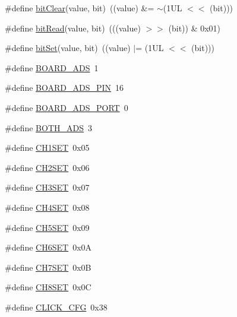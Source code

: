 \begin{DoxyCompactItemize}
\item 
\#define \hyperlink{group__Definitions__ADS1299_gabbe843c0521806a4ab2e7cffe44769e2}{bit\+Clear}(value,  bit)~((value) \&= $\sim$(1\+U\+L $<$$<$ (bit)))
\item 
\#define \hyperlink{group__Definitions__ADS1299_gaff20d8c0a05ad3043afa2e4ad9ebe768}{bit\+Read}(value,  bit)~(((value) $>$$>$ (bit)) \& 0x01)
\item 
\#define \hyperlink{group__Definitions__ADS1299_ga6a8195c0e930f86c6af03ba6af8b41dd}{bit\+Set}(value,  bit)~((value) $\vert$= (1\+U\+L $<$$<$ (bit)))
\item 
\#define \hyperlink{group__Definitions__ADS1299_ga00b00a77ec0833201721a60e77c1589e}{B\+O\+A\+R\+D\+\_\+\+A\+DS}~1
\item 
\#define \hyperlink{group__Definitions__ADS1299_ga58a88a84a905c1965823bfa2c2e77fa6}{B\+O\+A\+R\+D\+\_\+\+A\+D\+S\+\_\+\+P\+IN}~16
\item 
\#define \hyperlink{group__Definitions__ADS1299_ga27b778d3ec5d14180a1be88ed1badc02}{B\+O\+A\+R\+D\+\_\+\+A\+D\+S\+\_\+\+P\+O\+RT}~0
\item 
\#define \hyperlink{group__Definitions__ADS1299_gaadd2d23e89f5cb1196176cee428631a7}{B\+O\+T\+H\+\_\+\+A\+DS}~3
\item 
\#define \hyperlink{group__Definitions__ADS1299_ga8fea370fa35eeb28355a58a40783ec99}{C\+H1\+S\+ET}~0x05
\item 
\#define \hyperlink{group__Definitions__ADS1299_ga3e8ab2c505cc6f00a1807a151a9ebcdb}{C\+H2\+S\+ET}~0x06
\item 
\#define \hyperlink{group__Definitions__ADS1299_ga70dccc80e613cfc0eea471983aecc229}{C\+H3\+S\+ET}~0x07
\item 
\#define \hyperlink{group__Definitions__ADS1299_ga0d9979e6e1d8b4e7727063b2660ac10b}{C\+H4\+S\+ET}~0x08
\item 
\#define \hyperlink{group__Definitions__ADS1299_gaff7800e91abe1001d9e3c9febc34e0d3}{C\+H5\+S\+ET}~0x09
\item 
\#define \hyperlink{group__Definitions__ADS1299_ga4708b2ba51cdb3a41817f06b8982657f}{C\+H6\+S\+ET}~0x0A
\item 
\#define \hyperlink{group__Definitions__ADS1299_ga018ba15c7462bc82cae0c3695d4c0ed0}{C\+H7\+S\+ET}~0x0B
\item 
\#define \hyperlink{group__Definitions__ADS1299_ga9e870ff4a991cadaab80c387e09b33de}{C\+H8\+S\+ET}~0x0C
\item 
\#define \hyperlink{group__Definitions__ADS1299_ga72296c7a2c62252b65b70c387f3de322}{C\+L\+I\+C\+K\+\_\+\+C\+FG}~0x38
$$
\end{DoxyCompactItemize}
